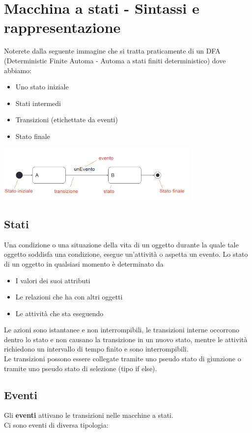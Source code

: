 \section{Macchina a stati - Sintassi e rappresentazione}
Noterete dalla seguente immagine che si tratta praticamente di un DFA 
(Deterministic Finite Automa - Automa a stati finiti deterministico) dove abbiamo:
\begin{itemize}
    \item Uno stato iniziale
    \item Stati intermedi
    \item Transizioni (etichettate da eventi)
    \item Stato finale
\end{itemize}
\begin{center}
    \includegraphics[scale=0.5, width=100mm]{img/macchina_a_stati_syntax.png}
\end{center}
\subsection*{Stati}
Una condizione o una situazione della vita di un oggetto durante la quale tale oggetto soddisfa
una condizione, esegue un'attività o aspetta un evento.
Lo stato di un oggetto in qualsiasi momento è determinato da
\begin{itemize}
    \item I valori dei suoi attributi
    \item Le relazioni che ha con altri oggetti
    \item Le attività che sta eseguendo
\end{itemize}
Le azioni sono istantanee e non interrompibili, le transizioni interne occorrono dentro
lo stato e non causano la transizione in un nuovo stato, mentre le attività richiedono un
intervallo di tempo finito e sono interrompibili.
\\ Le transizioni possono essere collegate tramite uno pseudo stato
di giunzione o tramite uno pseudo stato di selezione (tipo if else).
\subsection*{Eventi}
Gli \textbf{eventi} attivano le transizioni nelle macchine a stati.
\\ Ci sono eventi di diversa tipologia:
